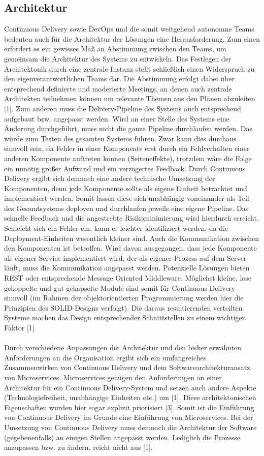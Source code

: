 \subsection{Architektur}
Continuous Delivery sowie DevOps und die somit weitgehend autonomne Teams bedeuten auch für die Architektur der Lösungen eine Herausforderung. Zum einen erfordert es ein gewisses Maß an Abstimmung zwischen den Teams, um gemeinsam die Architektur des Systems zu entwickeln. Das Festlegen der Architektonik durch eine zentrale Instanz stellt schließlich einen Widerspruch zu den eigenverantwortlichen Teams dar. Die Abstimmung erfolgt dabei über entsprechend definierte und moderierte Meetings, an denen auch zentrale Architekten teilnehmen können um relevante Themen aus den Plänen abzuleiten [1]. Zum anderen muss die Delivery-Pipeline des Systems auch entsprechend aufgebaut bzw. angepasst werden. Wird an einer Stelle des Systems eine Änderung durchgeführt, muss nicht die ganze Pipeline durchlaufen werden. Das würde zum Testen des gesamten Systems führen. Zwar kann dies durchaus sinnvoll sein, da Fehler in einer Komponente erst durch ein Fehlverhalten einer anderen Komponente auftreten können (Seiteneffekte), trotzdem wäre die Folge ein unnötig großer Aufwand und ein verzögertes Feedback. Durch Continuous Delivery ergibt sich demnach eine andere technische Umsetzung der Komponenten, denn jede Komponente sollte als eigene Einheit betrachtet und implementiert werden. Somit lassen diese sich unabhängig voneinander als Teil des Gesamtsystems deployen und durchlaufen jeweils eine eigene Pipeline. Das schnelle Feedback und die angestrebte Risikominimierung wird hierdurch erreicht. Schleicht sich ein Fehler ein, kann er leichter identifiziert werden, da die Deployment-Einheiten wesentlich kleiner sind. Auch die Kommunikation zwischen den Komponenten ist betroffen. Wird davon ausgegangen, dass jede Komponente als eigener Service implementiert wird, der als eigener Prozess auf dem Server läuft, muss die Kommunikation angepasst werden. Potenzielle Lösungen bieten REST oder entsprechende Message Oriented Middleware. Möglichst kleine, lose gekoppelte und gut gekapselte Module sind somit für Continuous Delivery sinnvoll (im Rahmen der objektorientierten Programmierung werden hier die Prinzipien des SOLID-Designs verfolgt). Die daraus resultierenden verteilten Systeme machen das Design entsprechender Schnittstellen zu einem wichtigen Faktor [1] \\ \\
Durch verschiedene Anpassungen der Architektur und den bisher erwähnten Anforderungen an die Organisation ergibt sich ein umfangreiches Zusammenwirken von Continuous Delivery und dem Softwarearchitekturansatz von Microservices. Microservices genügen den Anforderungen an einer Architektur für ein Continuous Delivery-System und setzen auch andere Aspekte (Technologiefreiheit, unabhängige Einheiten etc.) um [1]. Diese architektonischen Eigenschaften wurden hier sogar explizit priorisiert [3]. Somit ist die Einführung von Continuous Delivery im Grunde eine Einführung von Microservices. Bei der Umsetzung von Continuous Delivery muss demnach die Architektur der Software (gegebenenfalls) an einigen Stellen angepasst werden. Lediglich die Prozesse anzupassen bzw. zu ändern, reicht nicht aus [1].

